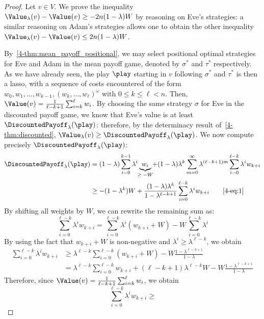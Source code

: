 \begin{proof}
  Let $v\in V$. We prove the inequality
  $\Value_\lambda(v)-\Value(v)\geq -2n(1-\lambda)W$ by reasoning on
  Eve's strategies: a similar reasoning on Adam's strategies allows
  one to obtain the other inequality
  $\Value_\lambda(v)-\Value(v)\leq 2n(1-\lambda)W$.

  By~\cref{4-thm:mean_payoff_positional}, we may select positional optimal
  strategies for Eve and Adam in the mean payoff game, denoted by
  $\sigma^*$ and $\tau^*$ respectively. As we have already seen, the play
  $\play$ starting in $v$ following $\sigma^*$ and $\tau^*$ is then a
  lasso, with a sequence of costs encountered of the form
  $w_0,w_1,\ldots,w_{k-1},(w_k,\ldots,w_\ell)^\omega$ with
  $0\leq k\leq \ell<n$. Then,
  $\Value(v)=\frac 1 {\ell-k+1}\sum_{i=k}^\ell w_i$. By choosing the
  same strategy $\sigma$ for Eve in the discounted payoff game, we
  know that Eve's value is at least
  $\DiscountedPayoff_\lambda(\play)$: therefore, by the determinacy
  result of~\cref{4-thm:discounted},
  $\Value_\lambda(v)\geq \DiscountedPayoff_\lambda(\play)$. We now
  compute precisely $\DiscountedPayoff_\lambda(\play)$:
  \begin{align*}
    \DiscountedPayoff_\lambda(\play)
    &=
      (1-\lambda)\sum_{i=0}^{k-1}\lambda^i
      \underbrace{w_i}_{\makebox[0pt][c]{\scriptsize$\geq -W$}}
      +
      (1-\lambda)\lambda^k\sum_{m=0}^\infty
      \lambda^{(\ell-k+1)m} \sum_{i=0}^{\ell-k}\lambda^iw_{k+i}\\
    & \geq -(1-\lambda^k)W +
      \frac{(1-\lambda) \lambda^k}{1-\lambda^{\ell-k+1}}
      \sum_{i=0}^{\ell-k}\lambda^iw_{k+i} \tag*{\eqref{4-eq:1}}
  \end{align*}
  By shifting all weights by $W$, we can rewrite the remaining
  sum as:
  \[\sum_{i=0}^{\ell-k}\lambda^iw_{k+i} =
    \sum_{i=0}^{\ell-k}\lambda^i(w_{k+i}+W) -
    W\sum_{i=0}^{\ell-k}\lambda^i\]
  By using the fact that $w_{k+i}+W$ is non-negative and
  $\lambda^i\geq \lambda^{\ell-k}$, we obtain
  \begin{align*}
    \sum_{i=0}^{\ell-k}\lambda^iw_{k+i}
    &\geq \lambda^{\ell-k}
      \sum_{i=0}^{\ell-k}(w_{k+i}+W) -W
      \frac{1-\lambda^{\ell-k+1}}{1-\lambda} \\
    &= \lambda^{\ell-k}
      \sum_{i=0}^{\ell-k}w_{k+i} + (\ell-k+1)\lambda^{\ell-k}W
      -W \frac{1-\lambda^{\ell-k+1}}{1-\lambda}
  \end{align*}
  Therefore, since $\Value(v)=\frac 1 {\ell-k+1}\sum_{i=k}^\ell w_i$,
  we obtain
  \[\sum_{i=0}^{\ell-k}\lambda^iw_{k+i}\geq
\]
\end{proof}
